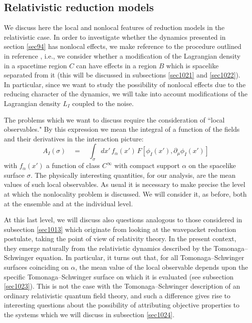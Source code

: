 \documentclass[12pt]{article}
\begin{document}
\subsection{Relativistic reduction models} \label{sec102}

We discuss here the local and nonlocal features of reduction
models in the relativistic case. In order to investigate whether
the dynamics presented in section \ref{sec94} has nonlocal
effects, we make reference to the procedure outlined in reference
\cite{hrf}, i.e., we consider whether a modification of the
Lagrangian density in a spacetime region $C$ can have effects in a
region $B$ which is spacelike separated from it (this will be
discussed in subsections \ref{sec1021} and \ref{sec1022}). In
particular, since we want to study the possibility of nonlocal
effects due to the reducing character of the dynamics, we will
take into account modifications of the Lagrangian density $L_{I}$
coupled to the noise.

The problems which we want to discuss require the consideration of
``local observables." By this expression we mean the integral of a
function of the fields and their derivatives in the interaction
picture:
\begin{equation}
A_{I}(\sigma) \quad = \quad \int_{\sigma} dx'\, f_{\alpha}(x')\,
F[\phi_{I}(x'), \partial_{\mu}\phi_{I}(x')]
\end{equation}
with $f_{\alpha}(x')$ a function of class $C^{\infty}$ with
compact support $\alpha$ on the spacelike surface $\sigma$. The
physically interesting quantities, for our analysis, are the mean
values of such local observables. As usual it is necessary to make
precise the level at which the nonlocality problem is discussed.
We will consider it, as before, both at the ensemble and at the
individual level.

At this last level, we will discuss also questions analogous to
those considered in subsection \ref{sec1013} which originate from
looking at the wavepacket reduction postulate, taking the point of
view of relativity theory. In the present context, they emerge
naturally from the relativistic dynamics described by the
Tomonaga--Schwinger equation. In particular, it turns out that,
for all Tomonaga--Schwinger surfaces coinciding on $\alpha$, the
mean value of the local observable depends upon the specific
Tomonaga--Schwinger surface on which it is evaluated (see
subsection \ref{sec1023}). This is not the case with the
Tomonaga--Schwinger description of an ordinary relativistic
quantum field theory, and such a difference gives rise to
interesting questions about the possibility of attributing objective
properties to the systems  which we will discuss in subsection
\ref{sec1024}.
\end{document}
